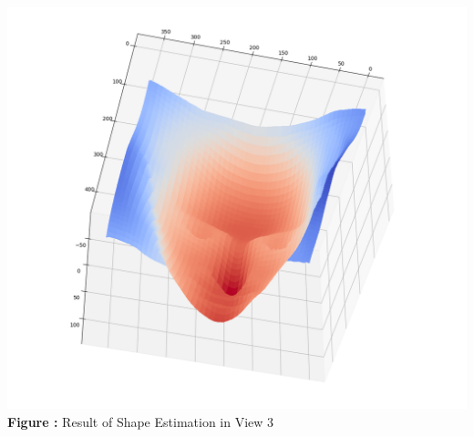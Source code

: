 \documentclass{article}
\begin{document}
	\begin{minipage}{1\linewidth}
	\centering
	\includegraphics[width=0.8\columnwidth, height=0.6\linewidth]{./Q2_e_res3.png}
	  \\%
	\textbf{Figure \thefigure:} Result of Shape Estimation in View 3  %
	\label{fig:Q2_e_res3}         %
	\end{minipage}
	
	\newpage
\end{document}
